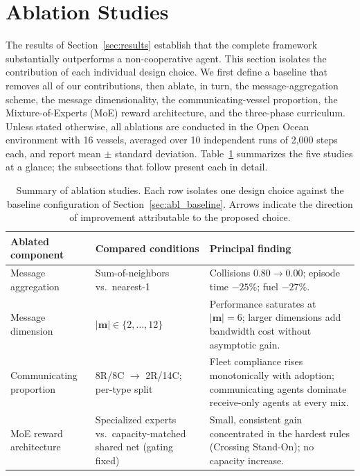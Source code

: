 \documentclass[final,5p,times,twocolumn]{elsarticle}
\begin{document}
\section{Ablation Studies}
\label{sec:ablation}
{\color{red}
The results of Section~\ref{sec:results} establish that the complete framework substantially outperforms a non-cooperative agent. This section isolates the contribution of each individual design choice. We first define a baseline that removes all of our contributions, then ablate, in turn, the message-aggregation scheme, the message dimensionality, the communicating-vessel proportion, the Mixture-of-Experts (MoE) reward architecture, and the three-phase curriculum. Unless stated otherwise, all ablations are conducted in the Open Ocean environment with 16 vessels, averaged over 10 independent runs of 2{,}000 steps each, and report mean $\pm$ standard deviation. Table~\ref{tab:abl_summary} summarizes the five studies at a glance; the subsections that follow present each in detail.

\begin{table}[t]
\centering
\caption{Summary of ablation studies. Each row isolates one design choice
against the baseline configuration of Section~\ref{sec:abl_baseline}.
Arrows indicate the direction of improvement attributable to the proposed
choice.}
\label{tab:abl_summary}

\begin{tabularx}{\textwidth}{
    >{\raggedright\arraybackslash}p{}
    >{\raggedright\arraybackslash}p{}
    >{\raggedright\arraybackslash}X}
\toprule
\textbf{Ablated component}
& \textbf{Compared conditions}
& \textbf{Principal finding} \\
\midrule

Message aggregation
& Sum-of-neighbors vs.\ nearest-1
& Collisions $0.80 \rightarrow 0.00$; episode time $-25\%$; fuel $-27\%$. \\

\addlinespace
Message dimension
& $|\mathbf{m}| \in \{2,\ldots,12\}$
& Performance saturates at $|\mathbf{m}|=6$; larger dimensions add bandwidth cost without asymptotic gain. \\

\addlinespace
Communicating proportion
& 8R/8C $\rightarrow$ 2R/14C; per-type split
& Fleet compliance rises monotonically with adoption; communicating agents dominate receive-only agents at every mix. \\

\addlinespace
MoE reward architecture
& Specialized experts vs.\ capacity-matched shared net (gating fixed)
& Small, consistent gain concentrated in the hardest rules (Crossing Stand-On); no capacity increase. \\


\end{tabularx}
\end{table}}
\end{document}
